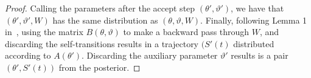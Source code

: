\begin{proof}
Calling the parameters 
after the accept step $(\theta', \vartheta')$, we have that
$(\theta', \vartheta',W)$ has the same distribution as
$(\theta, \vartheta,W)$.
Finally, following Lemma 1 in~\cite{RaoTeh13}, using the matrix 
$B(\theta,\vartheta)$ to make a backward pass through $W$,
and discarding the self-transitions results in a trajectory $(S'(t)$
distributed according to $A(\theta')$. Discarding the auxiliary parameter
$\vartheta'$ results is a pair $(\theta',S'(t))$ from
the posterior.
\end{proof}

